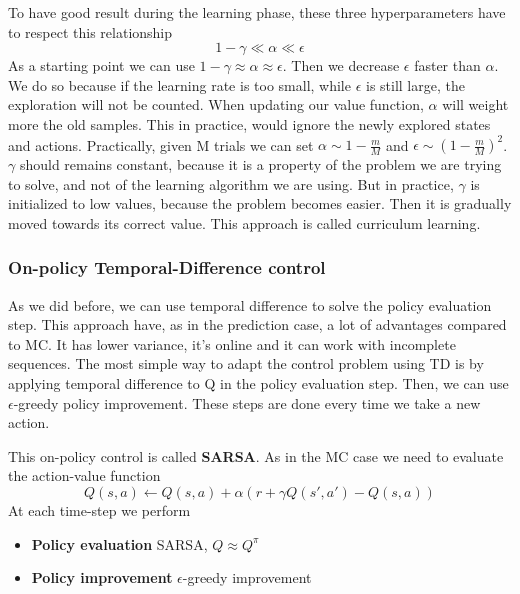 \documentclass[main.tex]{subfiles}
\begin{document}
To have good result during the learning phase, these three hyperparameters have to respect this relationship
\begin{equation*}
    1-\gamma \ll \alpha \ll \epsilon
\end{equation*}
As a starting point we can use $1-\gamma \approx \alpha \approx \epsilon$. Then we decrease $\epsilon$ faster than $\alpha$. We do so because if the learning rate is too small, while $\epsilon$ is still large, the exploration will not be counted. When updating our value function, $\alpha$ will weight more the old samples. This in practice, would ignore the newly explored states and actions.
Practically, given M trials we can set $\alpha \sim 1- \frac{m}{M}$ and $\epsilon \sim (1-\frac{m}{M})^2$. $\gamma$ should remains constant, because it is a property of the problem we are trying to solve, and not of the learning algorithm we are using. But in practice, $\gamma$ is initialized to low values, because the problem becomes easier. Then it is gradually moved towards its correct value. This approach is called curriculum learning.

\subsubsection{On-policy Temporal-Difference control}
As we did before, we can use temporal difference to solve the policy evaluation step. This approach have, as in the prediction case, a lot of advantages compared to MC. It has lower variance, it's online and it can work with incomplete sequences.
The most simple way to adapt the control problem using TD is by applying temporal difference to Q in the policy evaluation step. Then, we can use $\epsilon$-greedy policy improvement. These steps are done every time we take a new action.
\par \noindent
This on-policy control is called \textbf{SARSA}\footnotemark. As in the MC case we need to evaluate the action-value function
\begin{equation*}
    Q(s,a) \leftarrow Q(s,a) + \alpha(r + \gamma Q(s',a') - Q(s,a))
\end{equation*}
At each time-step we perform
\begin{itemize}
    \item \textbf{Policy evaluation} SARSA, $Q \approx Q^{\pi}$
    \item \textbf{Policy improvement} $\epsilon$-greedy improvement
\end{itemize}
\end{document}
